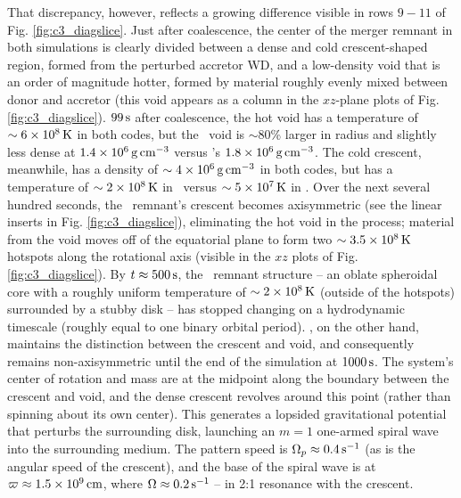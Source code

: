 

That discrepancy, however, reflects a growing difference visible in rows $9 - 11$ of Fig. \ref{fig:c3_diagslice}.  Just after coalescence, the center of the merger remnant in both simulations is clearly divided between a dense and cold crescent-shaped region, formed from the perturbed accretor WD, and a low-density void that is an order of magnitude hotter, formed by material roughly evenly mixed between donor and accretor (this void appears as a column in the $xz$-plane plots of Fig. \ref{fig:c3_diagslice}).  $99\,\mathrm{s}$ after coalescence, the hot void has a temperature of $\sim6\times10^8\,\mathrm{K}$ in both codes, but the \arepo\ void is $\sim80$\% larger in radius and slightly less dense at $1.4\times10^6\,\gcc$ versus \gasoline's $1.8\times10^6\,\gcc$.  The cold crescent, meanwhile, has a density of $\sim4\times10^6\,\gcc$ in both codes, but has a temperature of $\sim2\times10^8\,\mathrm{K}$ in \gasoline\ versus $\sim5\times10^7\,\mathrm{K}$ in \arepo.  Over the next several hundred seconds, the \gasoline\ remnant's crescent becomes axisymmetric (see the linear inserts in Fig. \ref{fig:c3_diagslice}), eliminating the hot void in the process; material from the void moves off of the equatorial plane to form two $\sim3.5\times10^8\,\mathrm{K}$ hotspots along the rotational axis (visible in the $xz$ plots of Fig. \ref{fig:c3_diagslice}).  By $t\approx500\,\mathrm{s}$, the \gasoline\ remnant structure -- an oblate spheroidal core with a roughly uniform temperature of $\sim 2 \times 10^8\,\mathrm{K}$ (outside of the hotspots) surrounded by a stubby disk -- has stopped changing on a hydrodynamic timescale (roughly equal to one binary orbital period).  \arepo, on the other hand, maintains the distinction between the crescent and void, and consequently remains non-axisymmetric until the end of the simulation at $1000\,\mathrm{s}$.  The system's center of rotation and mass are at the midpoint along the boundary between the crescent and void, and the dense crescent revolves around this point (rather than spinning about its own center).  This generates a lopsided gravitational potential that perturbs the surrounding disk, launching an $m = 1$ one-armed spiral wave into the surrounding medium.  The pattern speed is $\Omega_p \approx 0.4\,\mathrm{s}^{-1}$ (as is the angular speed of the crescent), and the base of the spiral wave is at $\varpi \approx 1.5\times10^9\,\mathrm{cm}$, where $\Omega \approx 0.2\,\mathrm{s}^{-1}$ -- in 2:1 resonance with the crescent.

